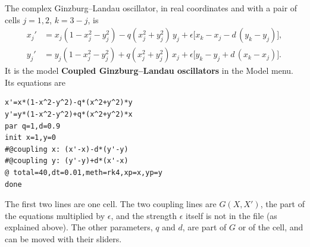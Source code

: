 \documentclass[11pt,a4paper]{article}
\newcommand{\ui}[1]{\textsf{\textbf{#1}}}          %
\begin{document}
The complex Ginzburg--Landau oscillator, in real coordinates and with a pair of cells $j=1,2$, $k=3-j$, is \cite{wilson2019}
\begin{align}
  x_j'&=x_j(1-x_j^2-y_j^2)-q(x_j^2+y_j^2)\,y_j+\epsilon\bigl[x_k-x_j-d\,(y_k-y_j)\bigr],\\
  y_j'&=y_j(1-x_j^2-y_j^2)+q(x_j^2+y_j^2)\,x_j+\epsilon\bigl[y_k-y_j+d\,(x_k-x_j)\bigr].
\end{align}
It is the model \ui{Coupled Ginzburg--Landau oscillators} in the Model menu. Its equations are
\begin{lstlisting}
x'=x*(1-x^2-y^2)-q*(x^2+y^2)*y
y'=y*(1-x^2-y^2)+q*(x^2+y^2)*x
par q=1,d=0.9
init x=1,y=0
#@coupling x: (x'-x)-d*(y'-y)
#@coupling y: (y'-y)+d*(x'-x)
@ total=40,dt=0.01,meth=rk4,xp=x,yp=y
done
\end{lstlisting}
The first two lines are one cell. The two coupling lines are $G(X,X')$, the part of the equations multiplied by $\epsilon$, and the strength $\epsilon$ itself is not in the file (as explained above). The other parameters, $q$ and $d$, are part of $G$ or of the cell, and can be moved with their sliders.
\end{document}

